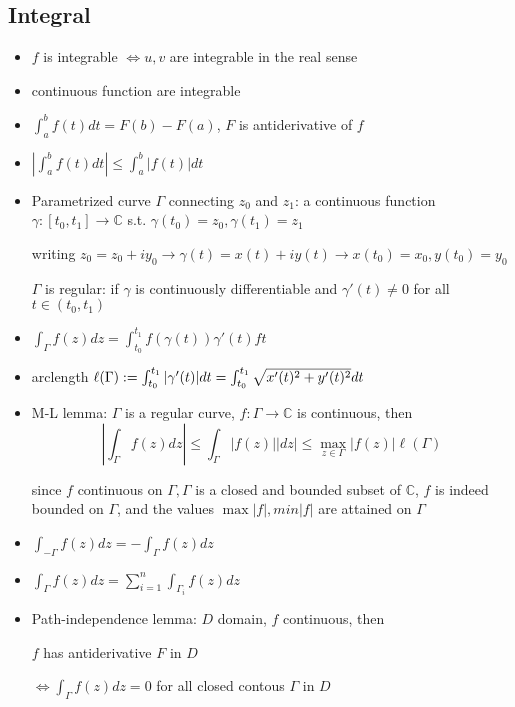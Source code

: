 \documentclass[10pt,a4paper]{article}
\begin{document}
\begin{multicols}{2}
\section{Integral}

\begin{itemize}
    \item $f$ is integrable $\Leftrightarrow u,v$ are integrable in the real sense
    \item continuous function are integrable
    \item $\int_a^b f(t)dt= F(b)-F(a)$, $F$ is antiderivative of $f$
    \item $\left| \int_a^b f(t)dt \right| \leq \int_a^b |f(t)| dt$
    \item Parametrized curve $\Gamma$ connecting $z_0$ and $z_1$: a continuous function $\gamma: [t_0,t_1] \to \mathbb C$ s.t. $\gamma(t_0)=z_0, \gamma(t_1)=z_1$
    
      writing $z_0=z_0+iy_0 \to \gamma(t)=x(t)+iy(t)\to x(t_0)=x_0, y(t_0)=y_0$
    
      $\Gamma$ is regular: if $\gamma$ is continuously differentiable and $\gamma'(t) \neq 0$ for all $t \in (t_0,t_1)$
    \item $ \int_\Gamma f(z)dz= \int_{t_0}^{t_1} f(\gamma(t))\gamma'(t)ft$
    
    \item arclength $\ell(\Gamma):= \int_{t_0}^{t_1}|\gamma'(t)|dt \\ = \int_{t_0}^{t_1} \sqrt{x'(t)^2+y'(t)^2} dt$
    \item M-L lemma: $\Gamma$ is a regular curve, $f: \Gamma \to \mathbb C$ is continuous, then
      $$\displaystyle \left| \int_\Gamma f(z)dz \right| \leq \int_\Gamma |f(z)||dz|\leq \max_{z\in \Gamma} |f(z)| \ell(\Gamma)$$
      
      since $f$ continuous on $\Gamma, \Gamma$ is a closed and bounded subset of $\mathbb C$, $f$ is indeed bounded on $\Gamma$, and the values $\max|f|, min|f|$ are attained on $\Gamma$
    \item $\int_{-\Gamma}f(z)dz = - \int_\Gamma f(z)dz$
    \item $\int_\Gamma f(z)dz = \sum_{i=1}^n \int_{\Gamma_i} f(z)dz$
    \item Path-independence lemma: $D$ domain, $f$ continuous, then
      
      $f$ has antiderivative $F$ in $D$
      
      $\Leftrightarrow \int_\Gamma f(z)dz=0$ for all closed contous $\Gamma$ in $D$
      

\end{itemize}
\end{multicols}
\end{document}
